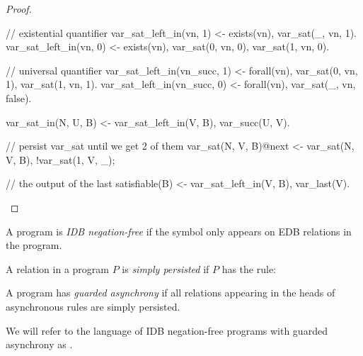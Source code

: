\begin{proof}
\begin{Dedalus}
// existential quantifier
var_sat_left_in(vn, 1) <- exists(vn),
var_sat(_, vn, 1).
var_sat_left_in(vn, 0) <- exists(vn),
var_sat(0, vn, 0), var_sat(1, vn, 0).

// universal quantifier
var_sat_left_in(vn_succ, 1) <- forall(vn),
var_sat(0, vn, 1), var_sat(1, vn, 1).
var_sat_left_in(vn_succ, 0) <- forall(vn),
var_sat(_, vn, false).

var_sat_in(N, U, B) <- var_sat_left_in(V, B),
var_succ(U, V).

// persist var_sat until we get 2 of them
var_sat(N, V, B)@next <- var_sat(N, V, B),
!var_sat(1, V, _);

// the output of the last 
satisfiable(B) <- var_sat_left_in(V, B), var_last(V).
\end{Dedalus}
\end{proof}




\begin{definition}
A \lang program is {\em IDB negation-free} if the \dedalus{!} symbol only appears on EDB relations in the program.
\end{definition}

\begin{definition}
A relation  in a program $P$ is {\em simply persisted} if $P$ has the rule: 
\end{definition}

\begin{definition}
A \lang program has {\em guarded asynchrony} if all relations appearing in the heads of asynchronous rules are simply persisted.
\end{definition}

We will refer to the language of IDB negation-free \lang programs with guarded asynchrony as \slang.

